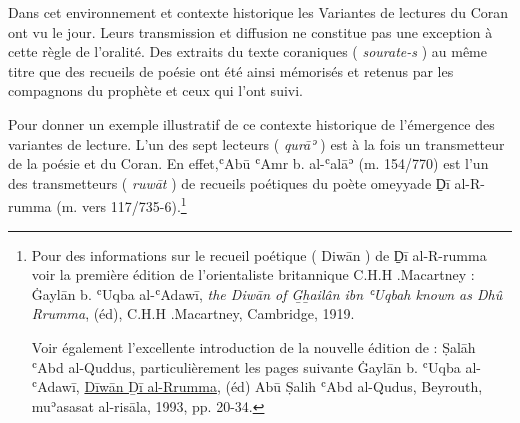 \documentclass[a4paper,12pt]{report}
\begin{document}
\begin{itemize}
  Dans cet environnement et contexte historique les Variantes de lectures  du Coran ont vu le jour. Leurs transmission et diffusion ne constitue pas une exception à cette règle de l’oralité.  Des extraits du texte coraniques  (  \textit{sourate-s} ) au même titre que des recueils de poésie ont été ainsi mémorisés et retenus par les compagnons du prophète et ceux qui l'ont suivi. 
  
  Pour donner un exemple illustratif de  ce contexte  historique de l'émergence des variantes de lecture. L’un des sept lecteurs ( \textit{qurāʾ} )  est  à la fois un transmetteur de la poésie et du Coran. En effet,ʿAbū ʿAmr b. al-ʿalāʾ  (m. 154/770) est l’un des transmetteurs ( \textit{ruwāt} )  de recueils poétiques  du poète omeyyade D̠ī al-R-rumma   (m. vers 117/735-6).\footnote{Pour des informations sur le recueil poétique ( Diwān ) de  D̠ī al-R-rumma     voir la première édition de l’orientaliste britannique C.H.H .Macartney :  Ġaylān b. ʿUqba al-ʿAdawī, \textit{the Diwān of G̲h̲ailân ibn ʿUqbah known as Dhû Rrumma}, (éd), C.H.H .Macartney, Cambridge, 1919. 

Voir également l’excellente introduction de la nouvelle édition de  :  Ṣalāh ʿAbd al-Quddus, particulièrement les pages suivante   
Ġaylān b. ʿUqba al-ʿAdawī, \underline{Dīwān Ḏī al-Rrumma}, (éd) Ab\=u Ṣalih ʿAbd al-Qudus, Beyrouth, muʾasasat al-risāla, 1993, pp. 20-34. }   


\end{itemize}
\end{document}
